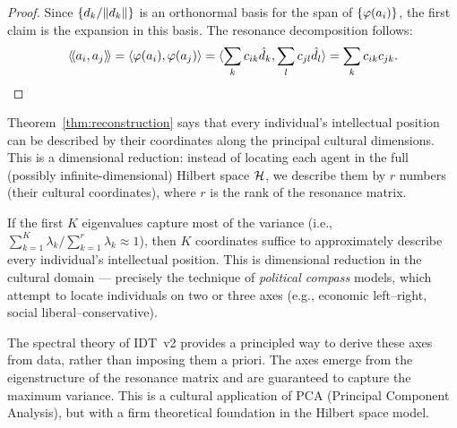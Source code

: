 \begin{proof}
Since $\{d_k/\lVert d_k \rVert\}$ is an orthonormal basis for the span of
$\{\varphi(a_i)\}$, the first claim is the expansion in this basis. The
resonance decomposition follows:
\[
  \langle\!\langle a_i, a_j \rangle\!\rangle = \langle \varphi(a_i), \varphi(a_j) \rangle
  = \langle \sum_k c_{ik} \hat{d}_k, \sum_l c_{jl} \hat{d}_l \rangle
  = \sum_k c_{ik} c_{jk}.
\]
\end{proof}

\begin{interpretation}
\label{interp:coordinates}
Theorem~\ref{thm:reconstruction} says that every individual's intellectual
position can be described by their coordinates along the principal cultural
dimensions. This is a dimensional reduction: instead of locating each agent
in the full (possibly infinite-dimensional) Hilbert space $\mathcal{H}$, we
describe them by $r$ numbers (their cultural coordinates), where $r$ is the
rank of the resonance matrix.

If the first $K$ eigenvalues capture most of the variance (i.e., $\sum_{k=1}^K
\lambda_k / \sum_{k=1}^r \lambda_k \approx 1$), then $K$ coordinates suffice
to approximately describe every individual's intellectual position. This is
dimensional reduction in the cultural domain --- precisely the technique of
\emph{political compass} models, which attempt to locate individuals on two or
three axes (e.g., economic left--right, social liberal--conservative).

The spectral theory of IDT~v2 provides a principled way to derive these axes
from data, rather than imposing them a priori. The axes emerge from the
eigenstructure of the resonance matrix and are guaranteed to capture the
maximum variance. This is a cultural application of PCA (Principal Component
Analysis), but with a firm theoretical foundation in the Hilbert space model.
\end{interpretation}

